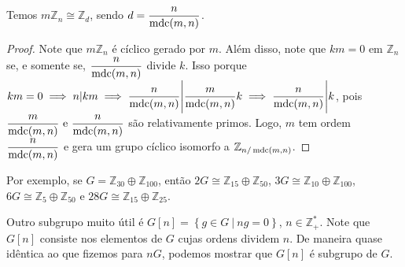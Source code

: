     	\begin{prop}
    	\label{regra nG}
    		Temos $m\mathbb{Z}_n\cong\mathbb{Z}_d$, sendo $\displaystyle{ d = \frac{n}{\operatorname{mdc}(m,n)} }$.
    	\end{prop}
    	\begin{proof}
    		Note que $m\mathbb{Z}_n$ é cíclico gerado por $m$. Além disso, note que $km = 0$ 
    		em $\mathbb{Z}_n$ se, e somente se, $\displaystyle{\frac{n}{\operatorname{mdc}(m,n)}  }$ divide $k$. 
    		Isso porque $km = 0\implies n| km\implies \displaystyle{ \frac{n}{\operatorname{mdc}(m,n)}
    		\Bigg| \frac{m}{\operatorname{mdc}(m,n)}k }\implies \displaystyle{ \frac{n}{\operatorname{mdc}(m,n)}\Bigg| k }$, pois
    		$\displaystyle{ \frac{m}{\operatorname{mdc}(m,n)}\text{ e }\frac{n}{\operatorname{mdc}(m,n)}  }$ são relativamente primos. 
    		Logo, $m$ tem ordem $\displaystyle{\frac{n}{\operatorname{mdc}(m,n)}}$ e gera um grupo cíclico isomorfo a
    		$\mathbb{Z}_{n/\operatorname{mdc}(m,n)}$.
    	\end{proof}
    	\begin{example}
    	Por exemplo, se $G = \mathbb{Z}_{30}\oplus\mathbb{Z}_{100}$, então 
    	$2G \cong \mathbb{Z}_{15}\oplus\mathbb{Z}_{50}$, 
    	$3G \cong \mathbb{Z}_{10}\oplus\mathbb{Z}_{100}$, 
    	$6G \cong \mathbb{Z}_5\oplus\mathbb{Z}_{50}$ e 
    	$28G \cong \mathbb{Z}_{15}\oplus\mathbb{Z}_{25}$.
    	\end{example}
    	Outro subgrupo muito útil é $G[n] = \left\{ g\in G \ \vert \ ng=0 \right\}$,
    	$n\in\mathbb{Z}_+^\ast$. Note que $G[n]$ consiste nos elementos de $G$ cujas ordens dividem $n$. 
    	De maneira quase idêntica ao que fizemos para $nG$, podemos mostrar que $G[n]$ é subgrupo de $G$.
    	
